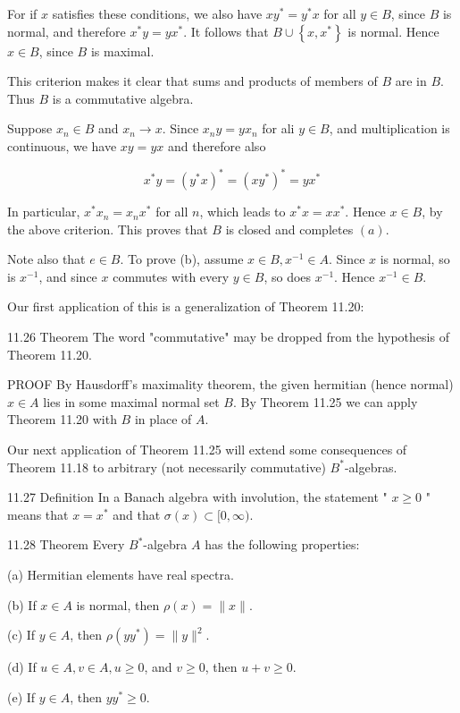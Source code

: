 \documentclass[10pt]{article}
\begin{document}
For if $x$ satisfies these conditions, we also have $x y^{*}=y^{*} x$ for all $y \in B$, since $B$ is normal, and therefore $x^{*} y=y x^{*}$. It follows that $B \cup\left\{x, x^{*}\right\}$ is normal. Hence $x \in B$, since $B$ is maximal.

This criterion makes it clear that sums and products of members of $B$ are in $B$. Thus $B$ is a commutative algebra.

Suppose $x_{n} \in B$ and $x_{n} \rightarrow x$. Since $x_{n} y=y x_{n}$ for ali $y \in B$, and multiplication is continuous, we have $x y=y x$ and therefore also

$$
x^{*} y=\left(y^{*} x\right)^{*}=\left(x y^{*}\right)^{*}=y x^{*}
$$

In particular, $x^{*} x_{n}=x_{n} x^{*}$ for all $n$, which leads to $x^{*} x=x x^{*}$. Hence $x \in B$, by the above criterion. This proves that $B$ is closed and completes $(a)$.

Note also that $e \in B$. To prove (b), assume $x \in B, x^{-1} \in A$. Since $x$ is normal, so is $x^{-1}$, and since $x$ commutes with every $y \in B$, so does $x^{-1}$. Hence $x^{-1} \in B$.

Our first application of this is a generalization of Theorem 11.20:

11.26 Theorem The word "commutative" may be dropped from the hypothesis of Theorem 11.20.

PROOF By Hausdorff's maximality theorem, the given hermitian (hence normal) $x \in A$ lies in some maximal normal set $B$. By Theorem 11.25 we can apply Theorem 11.20 with $B$ in place of $A$.

Our next application of Theorem 11.25 will extend some consequences of Theorem 11.18 to arbitrary (not necessarily commutative) $B^{*}$-algebras.

11.27 Definition In a Banach algebra with involution, the statement " $x \geq 0$ " means that $x=x^{*}$ and that $\sigma(x) \subset[0, \infty)$.

11.28 Theorem Every $B^{*}$-algebra $A$ has the following properties:

(a) Hermitian elements have real spectra.

(b) If $x \in A$ is normal, then $\rho(x)=\|x\|$.

(c) If $y \in A$, then $\rho\left(y y^{*}\right)=\|y\|^{2}$.

(d) If $u \in A, v \in A, u \geq 0$, and $v \geq 0$, then $u+v \geq 0$.

(e) If $y \in A$, then $y y^{*} \geq 0$.
\end{document}
